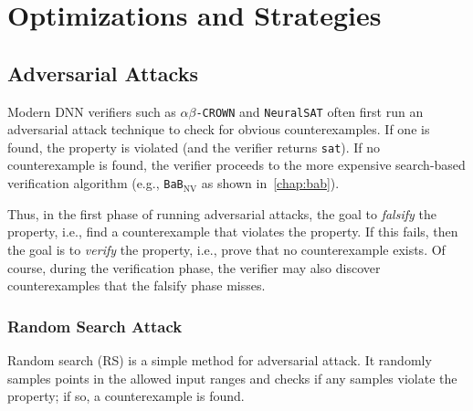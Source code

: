 \documentclass[oneside,11pt,dvipsnames]{book}
\numberwithin{equation}{section}
\theoremstyle{definition}
\theoremstyle{remark}
\newcommand{\crown}{\texttt{$\alpha\beta$-CROWN}}
\newcommand{\bab}{\texttt{BaB$_{\text{NV}}$}}
\newcommand{\neuralsat}{\texttt{NeuralSAT}}
\newcommand{\sat}{\texttt{sat}}
\begin{document}
\part{Optimizations and Strategies}\label{part:optimizations}

\chapter{Adversarial Attacks}\label{chap:adversarial-attacks}

Modern DNN verifiers such as \crown{} and \neuralsat{} often first run an adversarial attack technique to check for obvious counterexamples. If one is found, the property is violated (and the verifier returns \sat). If no counterexample is found, the verifier proceeds to the more expensive search-based verification algorithm (e.g., \bab{} as shown in~\autoref{chap:bab}).

Thus, in the first phase of running adversarial attacks, the goal to \emph{falsify} the property, i.e., find a counterexample that violates the property. If this fails, then the goal is to \emph{verify} the property, i.e., prove that no counterexample exists. Of course, during the verification phase, the verifier may also discover counterexamples that the falsify phase misses.

\section{Random Search Attack}
Random search (RS) is a simple method for adversarial attack.  It randomly samples points in the allowed input ranges and checks if any samples violate the property; if so, a counterexample is found.
\end{document}
